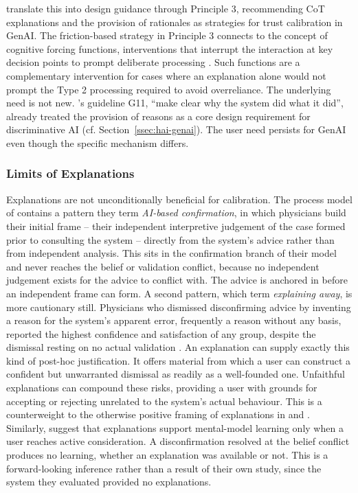 \textcite{Weisz2025} translate this into design guidance through Principle 3, recommending \ac{CoT} explanations and the provision of rationales as strategies for trust calibration in \ac{GenAI}. The friction-based strategy in Principle 3 connects to the concept of cognitive forcing functions, interventions that interrupt the interaction at key decision points to prompt deliberate processing \parencite{Buinca2021}. Such functions are a complementary intervention for cases where an explanation alone would not prompt the Type 2 processing required to avoid overreliance. The underlying need is not new. \textcite{Amershi2019}'s guideline G11, \enquote{make clear why the system did what it did}, already treated the provision of reasons as a core design requirement for discriminative \ac{AI} (cf. Section~\ref{ssec:hai-genai}). The user need persists for \ac{GenAI} even though the specific mechanism differs.

\subsubsection*{Limits of Explanations}

Explanations are not unconditionally beneficial for calibration. The process model of \textcite{Jussupow2021} contains a pattern they term \textit{AI-based confirmation}, in which physicians build their initial frame -- their independent interpretive judgement of the case formed prior to consulting the system -- directly from the system's advice rather than from independent analysis. This sits in the confirmation branch of their model and never reaches the belief or validation conflict, because no independent judgement exists for the advice to conflict with. The advice is anchored in before an independent frame can form. A second pattern, which \textcite{Jussupow2021} term \textit{explaining away}, is more cautionary still. Physicians who dismissed disconfirming advice by inventing a reason for the system's apparent error, frequently a reason without any basis, reported the highest confidence and satisfaction of any group, despite the dismissal resting on no actual validation \parencite{Jussupow2021}. An explanation can supply exactly this kind of post-hoc justification. It offers material from which a user can construct a confident but unwarranted dismissal as readily as a well-founded one. Unfaithful explanations \parencite[cf.][]{Lyu2023} can compound these risks, providing a user with grounds for accepting or rejecting unrelated to the system's actual behaviour. This is a counterweight to the otherwise positive framing of explanations in \textcite{Weisz2025} and \textcite{Shin2021}. Similarly, \textcite{Jussupow2021} suggest that explanations support mental-model learning only when a user reaches active consideration. A disconfirmation resolved at the belief conflict produces no learning, whether an explanation was available or not. This is a forward-looking inference rather than a result of their own study, since the system they evaluated provided no explanations.

